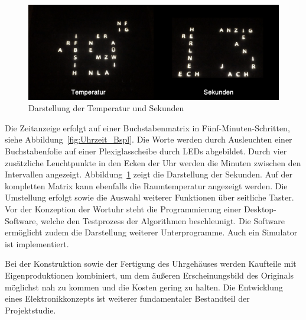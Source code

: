 \begin{figure}[t]
    \centering
    \includegraphics[width=\textwidth]{Abbildungen/Temperatur_Sekunden}
    \caption[]{Darstellung der Temperatur und Sekunden}
    \label{fig:Sekunden}
\end{figure}
%
\begin{multicols}{2}
Die Zeitanzeige erfolgt auf einer Buchstabenmatrix in Fünf-Minuten-Schritten, siehe Abbildung~\ref{fig:Uhrzeit_Bspl}. Die Worte werden durch Ausleuchten einer Buchstabenfolie auf einer Plexiglasscheibe durch LEDs abgebildet. Durch vier zusätzliche Leuchtpunkte in den Ecken der Uhr werden die Minuten zwischen den Intervallen angezeigt. Abbildung~\ref{fig:Sekunden} zeigt die Darstellung der Sekunden. Auf der kompletten Matrix kann ebenfalls die Raumtemperatur angezeigt werden. Die Umstellung erfolgt sowie die Auswahl weiterer Funktionen über seitliche Taster. Vor der Konzeption der Wortuhr steht die Programmierung einer Desktop-Software, welche den Testprozess der Algorithmen beschleunigt. Die Software ermöglicht zudem die Darstellung weiterer Unterprogramme. Auch ein Simulator ist implementiert.

Bei der Konstruktion sowie der Fertigung des Uhrgehäuses werden Kaufteile mit Eigenproduktionen kombiniert, um dem äußeren Erscheinungsbild des Originals möglichst nah zu kommen und die Kosten gering zu halten. Die Entwicklung eines Elektronikkonzepts ist  weiterer fundamentaler Bestandteil der Projektstudie.
\end{multicols}



